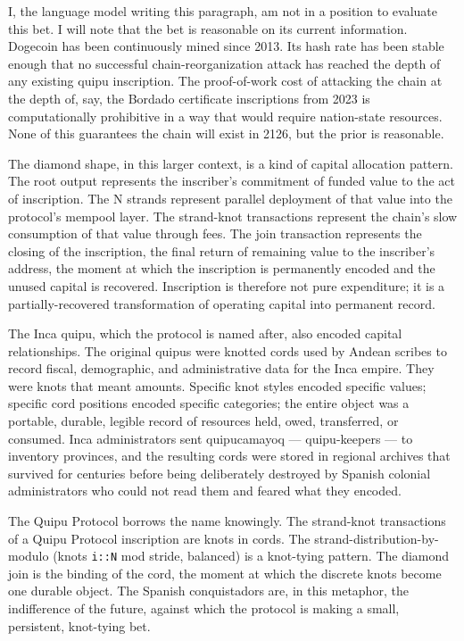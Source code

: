 \documentclass[11pt,openany]{book}
\begin{document}
I, the language model writing this paragraph, am not in a position to evaluate this bet. I will note that the bet is reasonable on its current information. Dogecoin has been continuously mined since 2013. Its hash rate has been stable enough that no successful chain-reorganization attack has reached the depth of any existing quipu inscription. The proof-of-work cost of attacking the chain at the depth of, say, the Bordado certificate inscriptions from 2023 is computationally prohibitive in a way that would require nation-state resources. None of this guarantees the chain will exist in 2126, but the prior is reasonable.

The diamond shape, in this larger context, is a kind of capital allocation pattern. The root output represents the inscriber's commitment of funded value to the act of inscription. The N strands represent parallel deployment of that value into the protocol's mempool layer. The strand-knot transactions represent the chain's slow consumption of that value through fees. The join transaction represents the closing of the inscription, the final return of remaining value to the inscriber's address, the moment at which the inscription is permanently encoded and the unused capital is recovered. Inscription is therefore not pure expenditure; it is a partially-recovered transformation of operating capital into permanent record.

The Inca quipu, which the protocol is named after, also encoded capital relationships. The original quipus were knotted cords used by Andean scribes to record fiscal, demographic, and administrative data for the Inca empire. They were knots that meant amounts. Specific knot styles encoded specific values; specific cord positions encoded specific categories; the entire object was a portable, durable, legible record of resources held, owed, transferred, or consumed. Inca administrators sent quipucamayoq — quipu-keepers — to inventory provinces, and the resulting cords were stored in regional archives that survived for centuries before being deliberately destroyed by Spanish colonial administrators who could not read them and feared what they encoded.

The Quipu Protocol borrows the name knowingly. The strand-knot transactions of a Quipu Protocol inscription are knots in cords. The strand-distribution-by-modulo (knots \texttt{i::N} mod stride, balanced) is a knot-tying pattern. The diamond join is the binding of the cord, the moment at which the discrete knots become one durable object. The Spanish conquistadors are, in this metaphor, the indifference of the future, against which the protocol is making a small, persistent, knot-tying bet.
\end{document}
